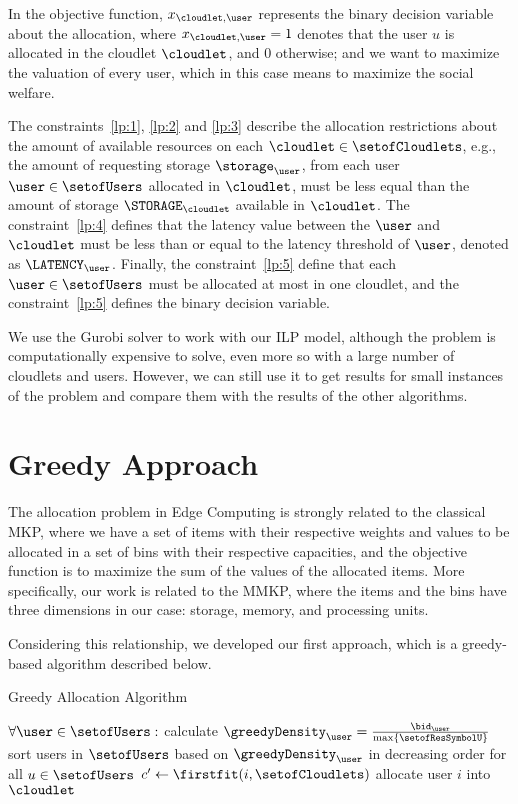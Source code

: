 \documentclass[English]{ic-tese-v3}
\begin{document}
In the objective function, $x_{\cloudlet, \user}$ represents the binary decision variable about the allocation, where $x_{\cloudlet, \user} = 1$ denotes that the user $u$ is allocated in the cloudlet $\cloudlet$, and $0$ otherwise; and we want to maximize the valuation of every user, which in this case means to maximize the social welfare. 

The constraints~\eqref{lp:1}, \eqref{lp:2} and \eqref{lp:3} describe the allocation restrictions about the amount of available resources on each $\cloudlet \in \setofCloudlets$, e.g., the amount of requesting storage $\storage_{\user}$, from each user $\user \in \setofUsers$ allocated in $\cloudlet$, must be less equal than the amount of storage $\STORAGE_{\cloudlet}$ available in $\cloudlet$. The constraint~\eqref{lp:4} defines that the latency value between the $\user$ and $\cloudlet$ must be less than or equal to the latency threshold of $\user$, denoted as $\LATENCY_{\user}$. Finally, the constraint~\eqref{lp:5} define that each $\user \in \setofUsers$ must be allocated at most in one cloudlet, and the constraint~\eqref{lp:5} defines the binary decision variable.

We use the Gurobi solver to work with our ILP model, although the problem is computationally expensive to solve, even more so with a large number of cloudlets and users. However, we can still use it to get results for small instances of the problem and compare them with the results of the other algorithms.

\section{Greedy Approach}
\label{sec:greedy}
The allocation problem in Edge Computing is strongly related to the classical MKP, where we have a set of items with their respective weights and values to be allocated in a set of bins with their respective capacities, and the objective function is to maximize the sum of the values of the allocated items. More specifically,  our work is related to the MMKP, where the items and the bins have three dimensions in our case: storage, memory, and processing units.

Considering this relationship, we developed our first approach, which is a greedy-based algorithm described below.
\begin{algorithm}[H]
\caption{Greedy Allocation Algorithm}\label{alg:greedy}
    \begin{algorithmic}[1]
        \State $\forall \user \in \setofUsers:$ calculate $\greedyDensity_{\user} = \frac{\bid_{\user}}{\max\{\setofResSymbolU\}}$
        \State sort users in $\setofUsers$ based on $\greedyDensity_{\user}$ in decreasing order for all $u \in \setofUsers$
            \State $c' \gets \firstfit(i, \setofCloudlets)$ 
                \State allocate user $i$ into $\cloudlet$
            \EndIf
        \EndFor
    \EndFunction
    \end{algorithmic}
\end{algorithm}
\end{document}

